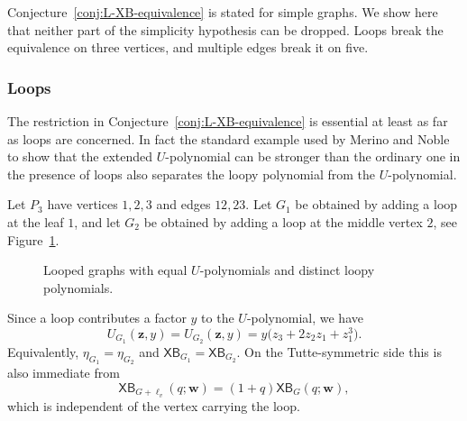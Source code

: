 \documentclass[11pt]{article}
\theoremstyle{plain}
\theoremstyle{definition}
\newcommand{\bw}{\mathbf{w}}
\newcommand{\bz}{\mathbf{z}}
\newcommand{\XB}{\mathsf{XB}} %
\numberwithin{equation}{section}
\begin{document}
Conjecture~\ref{conj:L-XB-equivalence} is stated for simple graphs.  We show here  that neither
part of the simplicity hypothesis can be dropped.
Loops break the equivalence on three vertices, and multiple edges break it on five.

\subsubsection{Loops}
\label{subsec:loops-obstruction}

The restriction in Conjecture~\ref{conj:L-XB-equivalence} is essential at least as far as loops are concerned.
In fact the standard example used by Merino and Noble to show that the extended $U$-polynomial can be stronger
than the ordinary one in the presence of loops also separates the loopy polynomial from the $U$-polynomial.

Let $P_3$ have vertices $1,2,3$ and edges $12,23$.  Let $G_1$ be obtained by
adding a loop at the leaf $1$, and let $G_2$ be obtained by adding a loop at
the middle vertex $2$, see Figure~\ref{fig:looped-P3}.

\begin{figure}[ht]
\centering
{}
\hspace{1.2cm}
\caption{Looped graphs with equal $U$-polynomials and distinct loopy
polynomials.}
\label{fig:looped-P3}
\end{figure}

Since a loop contributes a factor $y$ to the $U$-polynomial, we have
\begin{equation}\label{eq:looped-P3-U}
   U_{G_1}(\bz,y)
   =U_{G_2}(\bz,y)
   =y\bigl(z_3+2z_2z_1+z_1^3\bigr).
\end{equation}
Equivalently, $\eta_{G_1}=\eta_{G_2}$ and $\XB_{G_1}=\XB_{G_2}$.  On the
Tutte-symmetric side this is also immediate from
\begin{equation}\label{eq:XB-loop-rule}
   \XB_{G+\ell_v}(q;\bw)
   =(1+q)\XB_G(q;\bw),
\end{equation}
which is independent of the vertex carrying the loop.
\end{document}
